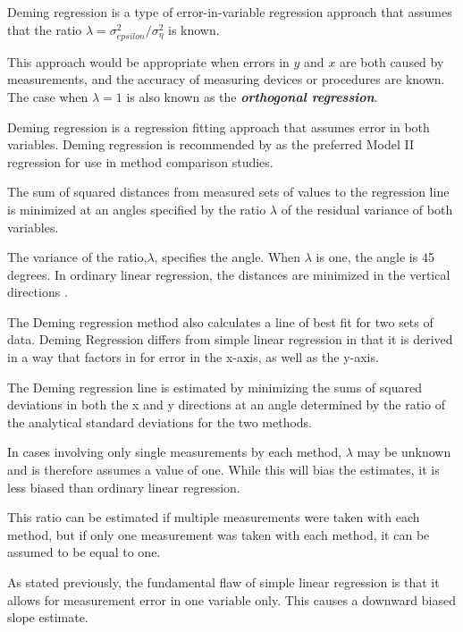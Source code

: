 \documentclass[12pt, a4paper]{report}
\theoremstyle{plain}
\theoremstyle{definition}
\theoremstyle{remark}
\begin{document}
Deming regression is a type of error-in-variable regression approach that assumes that the ratio $\lambda = \sigma^2_{epsilon}/\sigma^2_{\eta}$ is known. 

This approach would be appropriate when errors in $y$ and $x$ are both caused by measurements, and the accuracy of measuring devices or procedures are known. The case when $\lambda = 1$ is also known as the \textbf{\emph{orthogonal regression}}.

Deming regression is a regression fitting approach that assumes error in both variables. Deming regression is recommended by \citet*{CornCoch} as the preferred Model II regression for use in method comparison studies. 

The sum of squared distances from measured sets of values to the regression line is minimized at an angles specified by the ratio $\lambda$ of the residual variance of both variables. 

The variance of the ratio,$\lambda$, specifies the angle.  When $\lambda$ is one, the angle is 45 degrees. In ordinary linear regression, the distances are minimized in the vertical directions \citep{linnet99}.

The Deming regression method also calculates a line of best fit for two sets of data. Deming Regression differs from simple linear regression in that it is derived in a way that factors in for error in the x-axis, as well as the y-axis.

The Deming regression line is estimated by minimizing the sums of squared deviations in both the x and y directions at an angle determined by the ratio of the analytical standard deviations for the two methods.

In cases involving only single measurements by each method, $\lambda$ may be unknown and is therefore assumes a value of one. While this will bias the estimates, it is less biased than ordinary linear regression.

This ratio can be estimated if multiple measurements were taken with each method, but if only one measurement was taken with each method, it can be assumed to be equal to one.





As stated previously, the fundamental flaw of simple linear regression is that it allows for measurement error in one variable only. This causes a downward biased slope estimate.



\end{document}

